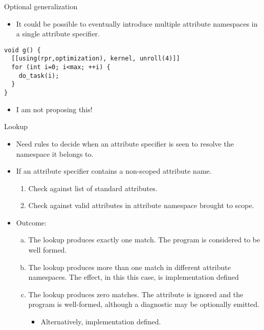 \begin{frame}[t,fragile]{Optional generalization}
\begin{itemize}
  \item It could be possible to eventually introduce multiple attribute
        namespaces in a single attribute specifier.
\end{itemize}
\vfill
\begin{lstlisting}
void g() {
  [[using(rpr,optimization), kernel, unroll(4)]]
  for (int i=0; i<max; ++i) {
    do_task(i);
  }
}
\end{lstlisting}
\vfill
\begin{itemize}
  \item \alert{I am not proposing this!}
\end{itemize}
\end{frame}

\begin{frame}[t,shrink]{Lookup}
\begin{itemize}
  \item Need rules to decide when an attribute specifier is seen to resolve the namespace
        it belongs to.
\end{itemize}
\vfill\pause
\begin{itemize}
  \item If an attribute specifier contains a non-scoped attribute name.
    \begin{enumerate}[1]
      \item Check against list of standard attributes.
      \item Check against valid attributes in attribute namespace brought to scope.
    \end{enumerate}
  \pause
  \item Outcome:
    \begin{enumerate}[a)]
      \item The lookup produces exactly one match. The program is considered
      to be well formed.
      
      \item The lookup produces more than one match in different attribute namespaces.
      The effect, in this this case, is implementation defined
      
      \item The lookup produces zero matches. The attribute is ignored and the
      program is well-formed, although a diagnostic may be optionally emitted.
        \begin{itemize}
          \item Alternatively, implementation defined.
        \end{itemize}
    \end{enumerate}
\end{itemize}
\end{frame}

